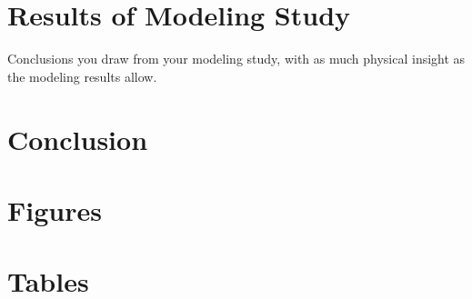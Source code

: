 \documentclass[]{article}
\begin{document}
\section{Results of Modeling Study}
Conclusions you draw from your modeling study, with as much physical insight
as the modeling results allow.


\section{Conclusion}






\appendix

\section{Figures}



\section{Tables}
\end{document}
